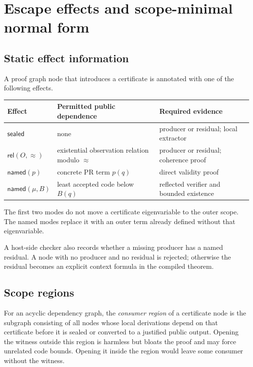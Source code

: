 \section{Escape effects and scope-minimal normal form}
\label{sec:effects}

\subsection{Static effect information}

A proof graph node that introduces a certificate is annotated with one of the
following effects.

\begin{center}
\begin{tabularx}{0.94\textwidth}{@{}lXl@{}}
\toprule
Effect & Permitted public dependence & Required evidence \\
\midrule
\(\mathsf{sealed}\) & none & producer or residual; local extractor \\
\(\mathsf{rel}(O,\approx)\) & existential observation relation modulo \(\approx\) & producer or residual; coherence proof \\
\(\mathsf{named}(p)\) & concrete PR term \(p(q)\) & direct validity proof \\
\(\mathsf{named}(\mu,B)\) & least accepted code below \(B(q)\) & reflected verifier and bounded existence \\
\bottomrule
\end{tabularx}
\end{center}

The first two modes do not move a certificate eigenvariable to the outer
scope.  The named modes replace it with an outer term already defined without
that eigenvariable.

A host-side checker also records whether a missing producer has a named
residual.  A node with no producer and no residual is rejected; otherwise the
residual becomes an explicit context formula in the compiled theorem.

\subsection{Scope regions}

For an acyclic dependency graph, the \emph{consumer region} of a certificate
node is the subgraph consisting of all nodes whose local derivations depend on
that certificate before it is sealed or converted to a justified public
output.  Opening the witness outside this region is harmless but bloats the
proof and may force unrelated code bounds.  Opening it inside the region would
leave some consumer without the witness.

